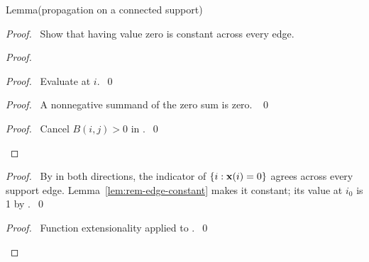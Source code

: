 \begin{namedresult}{Lemma}{(propagation on a connected support)}\label{lem:rem-propagation}
\end{namedresult}
\begin{proof}
\pfsketch\ Show that having value zero is constant across every edge.
\begin{proof}
\begin{proof}\pf\ Evaluate  at $i$.~\qed\end{proof}
\begin{proof}\pf\ A nonnegative summand of the zero sum
 is zero. ~\qed\end{proof}
\qedstep
\begin{proof}\pf\ Cancel $B(i,j)>0$ in .~\qed\end{proof}
\end{proof}
\begin{proof}\pf\ By  in both directions,
the indicator of $\{i:{\mathbf x}(i)=0\}$ agrees across every support edge.
Lemma~\ref{lem:rem-edge-constant} makes it constant; its value at $i_0$
is 1 by .~\qed\end{proof}
\qedstep
\begin{proof}\pf\ Function extensionality applied to .~\qed\end{proof}
\end{proof}

